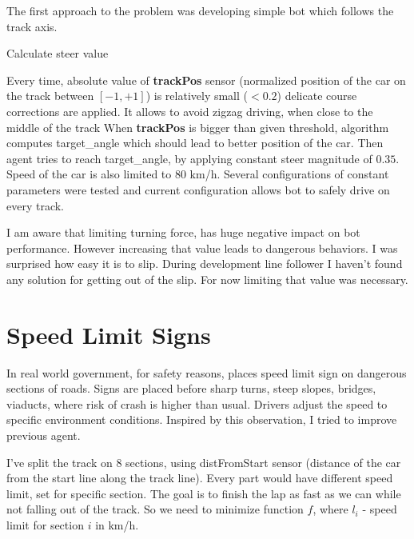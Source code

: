 \documentclass[declaration,shortabstract,english,inz]{iithesis}
\begin{document}
The first approach to the problem was developing simple bot which follows the track axis.


\begin{algorithm}
    \caption{Calculate steer value}
    \label{alg:steer}
    \begin{algorithmic}
        \ELSE 
        \ENDIF
    \end{algorithmic}
\end{algorithm}

Every time, absolute value of \textbf{trackPos} sensor (normalized position of the car on the track between $ [-1, +1] $) is relatively small ($ < 0.2 $) delicate course corrections are applied. It allows to avoid zigzag driving, when close to the middle of the track
When \textbf{trackPos} is bigger than given threshold, algorithm computes target\_angle which should lead to better position of the car.
Then agent tries to reach target\_angle, by applying constant steer magnitude of $0.35$.
Speed of the car is also limited to 80 km/h.
Several configurations of constant parameters were tested and current configuration allows bot to safely drive on every track.


I am aware that limiting turning force, has huge negative impact on bot performance.
However increasing that value leads to dangerous behaviors.
I was surprised how easy it is to slip.
During development line follower I haven't found any solution for getting out of the slip.
For now limiting that value was necessary.

\section{Speed Limit Signs}

In real world government, for safety reasons, places speed limit sign on dangerous sections of roads.
Signs are placed before sharp turns, steep slopes, bridges, viaducts, where risk of crash is higher than usual.
Drivers adjust the speed to specific environment conditions.
Inspired by this observation, I tried to improve previous agent.


I've split the track on 8 sections, using distFromStart sensor (distance of the car from the start line along the track line).
Every part would have different speed limit, set for specific section.
The goal is to finish the lap as fast as we can while not falling out of the track.
So we need to minimize function $f$, where $l_i$ - speed limit for section $i$ in km/h.
\end{document}
